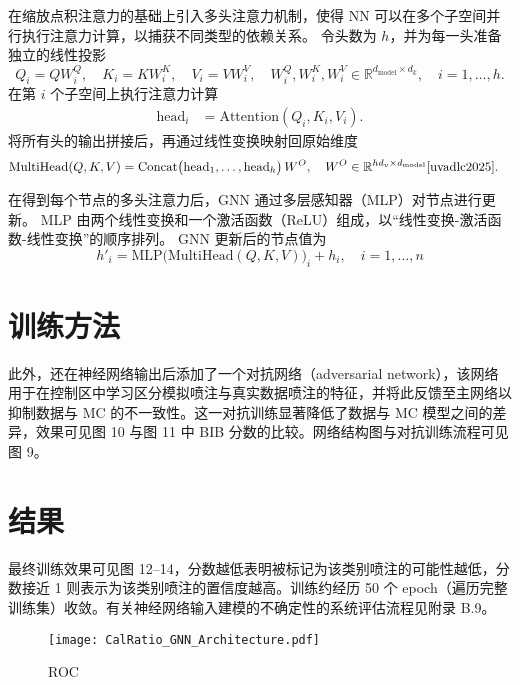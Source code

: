 在缩放点积注意力的基础上引入多头注意力机制，使得 NN 可以在多个子空间并行执行注意力计算，以捕获不同类型的依赖关系。
令头数为 $h$，并为每一头准备独立的线性投影
\[
    Q_i = QW_i^Q,\quad
    K_i = KW_i^K,\quad
    V_i = VW_i^V,\quad
    W_i^Q,W_i^K,W_i^V\in\mathbb{R}^{d_{\text{model}}\times d_k},
    \quad i=1,\dots,h.
\]
在第 $i$ 个子空间上执行注意力计算
\begin{align}
    \mathrm{head}_i & = \mathrm{Attention}(Q_i, K_i, V_i).
\end{align}
将所有头的输出拼接后，再通过线性变换映射回原始维度
\begin{align}
    \mathrm{MultiHead}(Q,K,V)
     & = \mathrm{Concat}\bigl(\mathrm{head}_1,\dots,\mathrm{head}_h\bigr)\,W^O,
    \quad W^O\in\mathbb{R}^{hd_v\times d_{\text{model}}}
    \cite{uvadlc2025}.
\end{align}

在得到每个节点的多头注意力后，GNN 通过多层感知器（MLP）对节点进行更新。
MLP 由两个线性变换和一个激活函数（ReLU）组成，以“线性变换-激活函数-线性变换”的顺序排列。
GNN 更新后的节点值为
\begin{equation}
    h'_i = \mathrm{MLP}\bigl(\mathrm{MultiHead}(Q,K,V)\bigr)_i + h_i,
    \quad i=1,\dots,n
\end{equation}


\section{训练方法}
此外，还在神经网络输出后添加了一个对抗网络（adversarial network），该网络用于在控制区中学习区分模拟喷注与真实数据喷注的特征，并将此反馈至主网络以抑制数据与 MC 的不一致性。这一对抗训练显著降低了数据与 MC 模型之间的差异，效果可见图 10 与图 11 中 BIB 分数的比较。网络结构图与对抗训练流程可见图 9。


\section{结果}
最终训练效果可见图 12--14，分数越低表明被标记为该类别喷注的可能性越低，分数接近 1 则表示为该类别喷注的置信度越高。训练约经历 50 个 epoch（遍历完整训练集）收敛。有关神经网络输入建模的不确定性的系统评估流程见附录 B.9。

\begin{figure}[ht]
    \centering
    \texttt{[image: CalRatio\_GNN\_Architecture.pdf]}
    \caption{ROC}
    \label{fig:ROC}
\end{figure}
